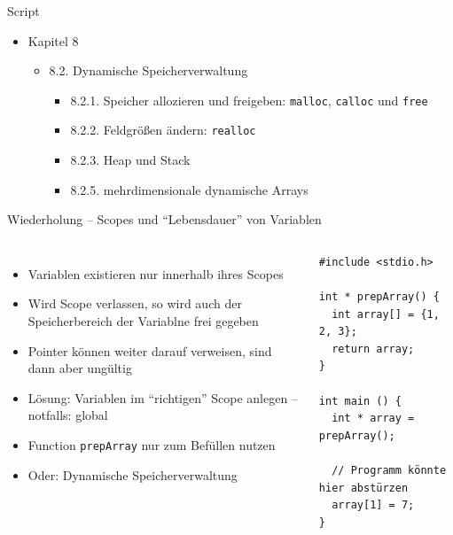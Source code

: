 
\begin{frame}{Script}
%
\begin{itemize}
\item Kapitel 8
	\begin{itemize}
	\item 8.2. Dynamische Speicherverwaltung
		\begin{itemize}
		\item 8.2.1. Speicher allozieren und freigeben: \texttt{malloc}, \texttt{calloc} und \texttt{free}
		\item 8.2.2. Feldgrößen ändern: \texttt{realloc}
		\item 8.2.3. Heap und Stack
		\item 8.2.5. mehrdimensionale dynamische Arrays
		\end{itemize}
	\end{itemize}
\end{itemize}
%
\end{frame}


\begin{frame}[fragile]{Wiederholung -- Scopes und \enquote{Lebensdauer} von Variablen}
%
\begin{columns}[T]
\begin{itemize}
\item Variablen existieren nur innerhalb  ihres Scopes
\item Wird Scope verlassen, so wird auch der Speicherbereich der Variablne frei gegeben
\item Pointer können weiter darauf verweisen, sind dann aber ungültig
\item Lösung: Variablen im \enquote{richtigen} Scope anlegen -- notfalls: global
\item Function \texttt{prepArray} nur zum Befüllen nutzen
\item Oder: Dynamische Speicherverwaltung
\end{itemize}
%
\begin{warnbox}[Arrayzugriff außerhalb Lebensdauer, leftupper=6mm]
\begin{verbatim}
#include <stdio.h>

int * prepArray() {
  int array[] = {1, 2, 3};
  return array;
}

int main () {
  int * array = prepArray();
  
  // Programm könnte hier abstürzen
  array[1] = 7;
}
\end{verbatim}
\end{warnbox}
\end{columns}
%
\end{frame}

